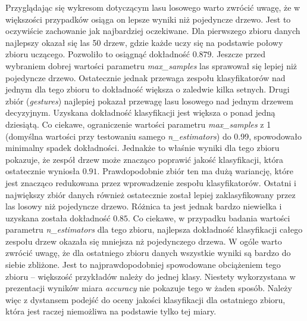 \documentclass{classrep}
\begin{document}
{{            Przyglądając się wykresom dotyczącym lasu losowego warto zwrócić uwagę, że w większości przypadków osiąga on lepsze wyniki niż pojedyncze drzewo. Jest to oczywiście zachowanie jak najbardziej oczekiwane. Dla pierwszego zbioru danych najlepszy okazał się las 50 drzew, gdzie każde uczy się na podstawie połowy zbioru uczącego. Pozwoliło to osiągnąć dokładność $0.879$. Jeszcze przed wybraniem dobrej wartości parametru \emph{max\_samples} las sprawował się lepiej niż pojedyncze drzewo. Ostatecznie jednak przewaga zespołu klasyfikatorów nad jednym dla tego zbioru to dokładność większa o zaledwie kilka setnych. Drugi zbiór (\emph{gestures}) najlepiej pokazał przewagę lasu losowego nad jednym drzewem decyzyjnym. Uzyskana dokładność klasyfikacji jest większa o ponad jedną dziesiątą. Co ciekawe, ograniczenie wartości parametru \emph{max\_samples} z 1 (domyślna wartości przy testowaniu samego \emph{n\_estimators}) do 0.99, spowodowało minimalny spadek dokładności. Jednakże to właśnie wyniki dla tego zbioru pokazuje, że zespół drzew może znacząco poprawić jakość klasyfikacji, która ostatecznie wyniosła $0.91$. Prawdopodobnie zbiór ten ma dużą wariancję, które jest znacząco redukowana przez wprowadzenie zespołu klasyfikatorów. Ostatni i największy zbiór danych również ostatecznie został lepiej zaklasyfikowany przez las losowy niż pojedyncze drzewo. Różnica ta jest jednak bardzo niewielka i uzyskana została dokładność $0.85$. Co ciekawe, w przypadku badania wartości parametru \emph{n\_estimators} dla tego zbioru, najlepsza dokładność klasyfikacji całego zespołu drzew okazała się mniejsza nż pojedynczego drzewa. W ogóle warto zwrócić uwagę, że dla ostatniego zbioru danych wszystkie wyniki są bardzo do siebie zbliżone. Jest to najprawdopodobniej spowodowane obciążeniem tego zbioru -- większość przykładów należy do jednej klasy. Niestety wykorzystana w prezentacji wyników miara \emph{accuracy} nie pokazuje tego w żaden sposób. Należy więc z dystansem podejść do oceny jakości klasyfikacji dla ostatniego zbioru, która jest raczej niemożliwa na podstawie tylko tej miary.
        }
    }
\end{document}

